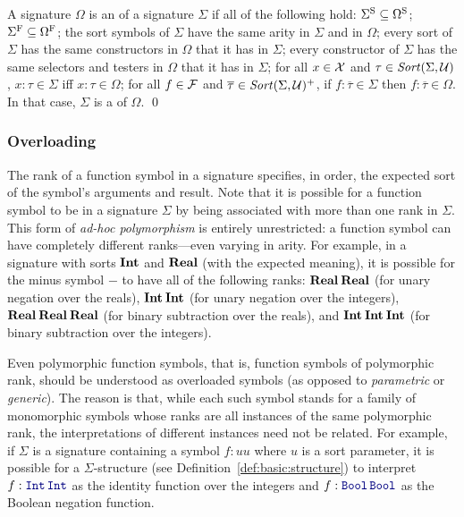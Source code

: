 \begin{definition}[Signature expansions] 

A signature $\Omega$ is an  of a signature $\Sigma$
if all of the following hold:
$\Sigma^\mathrm{S} \subseteq \Omega^\mathrm{S}$;
$\Sigma^\mathrm{F} \subseteq \Omega^\mathrm{F}$;
the sort symbols of $\Sigma$ have the same arity in $\Sigma$ and in $\Omega$;
every sort of $\Sigma$ has the same constructors in $\Omega$ that it has in $\Sigma$;
every constructor of $\Sigma$ has the same selectors and testers in $\Omega$ 
that it has in $\Sigma$;
for all $x \in \mathcal{X}$ and $\tau \in \mathit{Sort}(\Sigma, \mathcal{U})$,
$x{:}\tau \in \Sigma$ iff $x{:}\tau \in \Omega$;
for all $f \in \mathcal{F}$ and $\overline{\tau} \in \mathit{Sort}(\Sigma, \mathcal{U})^+$,
if $f{:}\overline{\tau} \in \Sigma$ then $f{:}\overline{\tau} \in \Omega$.
In that case, $\Sigma$ is a  of $\Omega$.
\qed
\end{definition}


\subsubsection{Overloading}
The rank of a function symbol in a signature specifies, in order,
the expected sort of the symbol's arguments and result.
Note that it is possible for a function symbol
to be  in a signature $\Sigma$
by being associated with more than one rank in $\Sigma$.
This form of \emph{ad-hoc polymorphism} is entirely unrestricted: 
a function symbol can have completely different ranks---even varying in arity. 
For example,
in a signature with sorts $\textbf{Int}$ and $\textbf{Real}$ (with the expected meaning),
it is possible for the minus symbol $-$ to have all of the following ranks:  
$\textbf{Real}\:\textbf{Real}$ (for unary negation over the reals),
$\textbf{Int}\:\textbf{Int}$ (for unary negation over the integers),
$\textbf{Real}\:\textbf{Real}\:\textbf{Real}$ (for binary subtraction over the reals),
and
$\textbf{Int}\:\textbf{Int}\:\textbf{Int}$ (for binary subtraction over the integers).

\begin{newver}
\begin{remark}
Even polymorphic function symbols, that is, 
function symbols of polymorphic rank, should be understood as overloaded symbols
(as opposed to \emph{parametric} or \emph{generic}).  
The reason is that, while each such symbol stands for a family of monomorphic symbols 
whose ranks are all instances of the same polymorphic rank,
the interpretations of different instances need not be related.
For example, if $\Sigma$ is a signature containing a symbol $f:uu$ 
where $u$ is a sort parameter,
it is possible for a $\Sigma$-structure (see Definition~\ref{def:basic:structure}) 
to interpret
$f:\ter{Int}\,\ter{Int}$ as the identity function over the integers and 
$f:\ter{Bool}\,\ter{Bool}$ as the Boolean negation function. 
\end{remark}
\end{newver}


